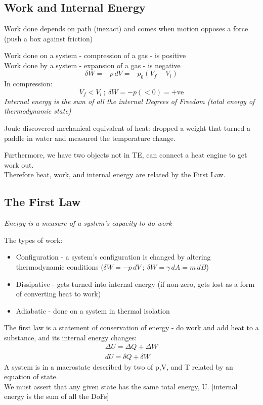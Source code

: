 \documentclass[a4paper, 11pt, normalem]{report}
\begin{document}
\chapter{}
\section{Work and Internal Energy}
Work done depends on path (inexact) and comes when motion opposes a force (push a box against friction)

Work done on a system - compression of a gas - is positive \\
Work done by a system - expansion of a gas - is negative
\begin{equation*}
    \delta W = -p\,dV = -p_{0}(V_f - V_i)
\end{equation*}
In compression:
\begin{equation*}
    V_f < V_i ~;~ \delta W = -p( < 0) = +\text{ve}
\end{equation*}
\emph{Internal energy is the sum of all the internal Degrees of Freedom (total energy of thermodynamic state)}

Joule discovered mechanical equivalent of heat: dropped a weight that turned a paddle in water and measured the temperature change.

Furthermore, we have two objects not in TE, can connect a heat engine to get work out. \\
Therefore heat, work, and internal energy are related by the First Law.

\section{The First Law}
 \emph{Energy is a measure of a system's capacity to do work}

The types of work:
\begin{itemize}
    \item Configuration - a system's configuration is changed by altering thermodynamic conditions ($\delta W = -p\,dV ~;~ \delta W = \gamma\,dA = m\,dB$)
    \item Dissipative - gets turned into internal energy (if non-zero, gets lost as a form of converting heat to work)
    \item Adiabatic - done on a system in thermal isolation
\end{itemize}

The first law is a statement of conservation of energy - do work and add heat to a substance, and its internal energy changes:
\begin{gather*}
    \Delta U = \Delta Q + \Delta W \\
    dU = \delta Q + \delta W
\end{gather*}
A system is in a macrostate described by two of p,V, and T related by an equation of state. \\
We must assert that any given state has the same total energy, U. [internal energy is the sum of all the DoFs]
\end{document}
